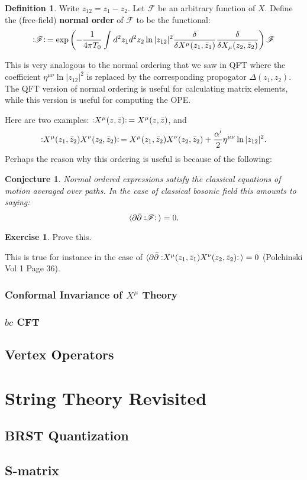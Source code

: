 \documentclass{report}
\theoremstyle{plain}
\newtheorem{conjecture}[theorem]{Conjecture}
\theoremstyle{definition}
\newtheorem{definition}[theorem]{Definition}
\newtheorem{exercise}{Exercise}[section]
\theoremstyle{remark}
\newcommand{\FR}[2]{\frac{#1}{#2}}
\newcommand{\ms}{\mathscr}
\newcommand{\di}{\partial}
\newcommand{\normalorder}[1]{\vcentcolon\mathrel{#1}\vcentcolon\,}
\begin{document}
\begin{definition}
  Write $z_{12} = z_1 - z_2$. Let $\ms F$ be an arbitrary function of
  $X$. Define the (free-field) {\bf normal order} of $\ms F$ to be the
  functional:
  \[ \normalorder{\ms F} = \exp \left( -\FR{1}{4\pi T_0}\int d^2z_1d^2z_2 \ln|z_{12}|^2
  \FR{\delta}{\delta X^\mu(z_1,\bar z_1)}
  \FR{\delta}{\delta X_\mu(z_2,\bar z_2)} \right) \ms F\]
\end{definition}
This is very analogous to the normal ordering that we saw in QFT where the
coefficient $\eta^{\mu\nu}\ln|z_{12}|^2$ is replaced by the corresponding
propogator $\Delta(z_1,z_2)$. The QFT version of normal ordering is useful
for calculating matrix elements, while this version is useful for computing
the OPE.

Here are two examples: $\normalorder{X^\mu(z,\bar z)} = X^\mu(z,\bar z)$,
and \[\normalorder{X^\mu(z_1,\bar z_2) X^\nu(z_2,\bar z_2)} = X^\mu(z_1,\bar
z_2) X^\nu(z_2,\bar z_2) + \FR{\alpha'}{2}\eta^{\mu\nu}\ln|z_{12}|^2.\]
Perhaps the reason why this ordering is useful is because of the following:

\begin{conjecture} Normal ordered expressions satisfy the classical
equations of motion averaged over paths. In the case of classical bosonic
field this amounts to saying:
\[ \braket{ \di\bar\di \normalorder{\ms F} } = 0.\]
\end{conjecture}
\begin{exercise} Prove this.
\end{exercise}
This is true for instance in the case of $\braket{\di\bar\di \normalorder{
X^\mu(z_1,\bar z_1) X^\nu(z_2,\bar z_2)}} = 0$ (Polchinski Vol 1 Page 36).

\subsection{Conformal Invariance of $X^\mu$ Theory}
\subsection{$bc$ CFT}
\section{Vertex Operators}

\chapter{String Theory Revisited}

\section{BRST Quantization}

\section{S-matrix}
\end{document}
